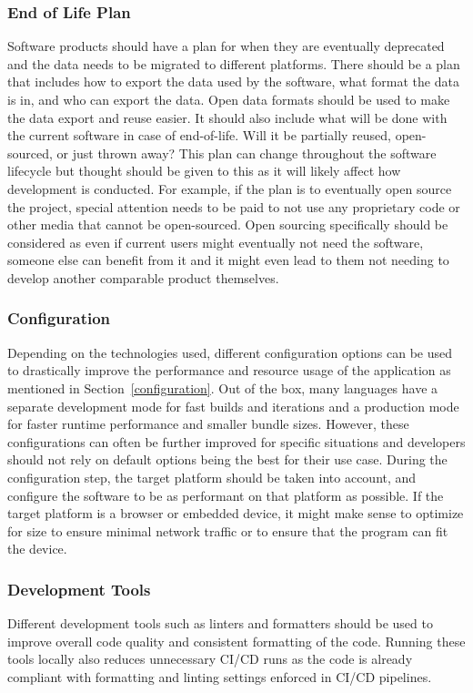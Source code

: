 \subsubsection{End of Life Plan}
Software products should have a plan for when they are eventually deprecated and the data needs to be migrated to different platforms. There should be a plan that includes how to export the data used by the software, what format the data is in, and who can export the data. Open data formats should be used to make the data export and reuse easier. It should also include what will be done with the current software in case of end-of-life. Will it be partially reused, open-sourced, or just thrown away? This plan can change throughout the software lifecycle but thought should be given to this as it will likely affect how development is conducted. For example, if the plan is to eventually open source the project, special attention needs to be paid to not use any proprietary code or other media that cannot be open-sourced. Open sourcing specifically should be considered as even if current users might eventually not need the software, someone else can benefit from it and it might even lead to them not needing to develop another comparable product themselves.

\subsubsection{Configuration}
Depending on the technologies used, different configuration options can be used to drastically improve the performance and resource usage of the application as mentioned in Section~\ref{configuration}. Out of the box, many languages have a separate development mode for fast builds and iterations and a production mode for faster runtime performance and smaller bundle sizes. However, these configurations can often be further improved for specific situations and developers should not rely on default options being the best for their use case. During the configuration step, the target platform should be taken into account, and configure the software to be as performant on that platform as possible. If the target platform is a browser or embedded device, it might make sense to optimize for size to ensure minimal network traffic or to ensure that the program can fit the device.

\subsubsection{Development Tools}
Different development tools such as linters and formatters should be used to improve overall code quality and consistent formatting of the code. Running these tools locally also reduces unnecessary CI/CD runs as the code is already compliant with formatting and linting settings enforced in CI/CD pipelines.

